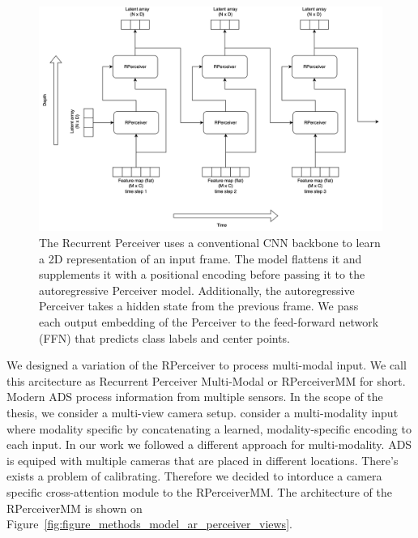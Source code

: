 \begin{figure}
    \centering
    \includegraphics[width=\textwidth]{figures/figure_methods_recurrent_perceiver.svg}
    \caption{The Recurrent Perceiver uses a conventional CNN backbone to learn a 2D representation of an input frame. The model flattens it and supplements it with a positional encoding before passing it to the autoregressive Perceiver model. Additionally, the autoregressive Perceiver takes a hidden state from the previous frame. We pass each output embedding of the Perceiver to the feed-forward network (FFN) that predicts class labels and center points.}
    \label{fig:figure_methods_recurrent_perceiver}
\end{figure}

We designed a variation of the RPerceiver to process multi-modal input. We call this arcitecture as Recurrent Perceiver Multi-Modal or RPerceiverMM for short. Modern ADS process information from multiple sensors. In the scope of the thesis, we consider a multi-view camera setup. \cite{jaeglePerceiverGeneralPerception2021} consider a multi-modality input where modality specific by concatenating a learned, modality-specific encoding to each input. In our work we followed a different approach for multi-modality. ADS is equiped with multiple cameras that are placed in different locations. There's exists a problem of calibrating. Therefore we decided to intorduce a camera specific cross-attention module to the RPerceiverMM. The architecture of the RPerceiverMM is shown on Figure~\ref{fig:figure_methods_model_ar_perceiver_views}.


